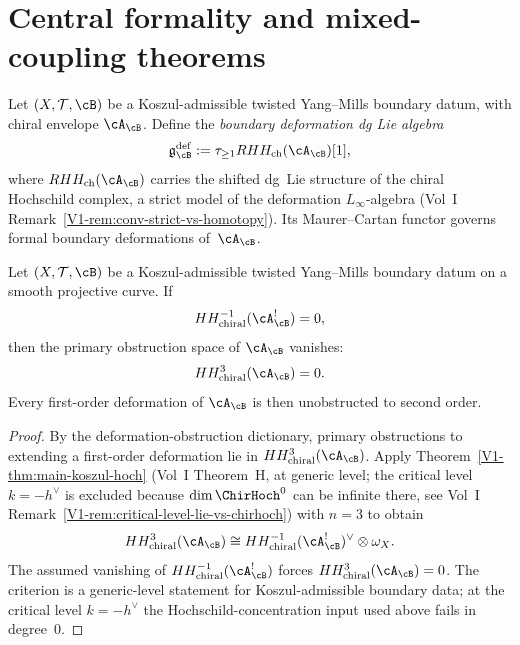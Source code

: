 \section{Central formality and mixed-coupling theorems}
\label{sec:twisted-ym-central-formality}

\begin{definition}
\label{def:twisted-ym-def-dglie}
Let $(X,\mathcal{T},\cB)$ be a Koszul-admissible twisted Yang--Mills boundary datum, with chiral envelope $\cA_{\cB}$. Define the \emph{boundary deformation dg Lie algebra}
\[
\mathfrak{g}^{\mathrm{def}}_{\cB}
:=
\tau_{\ge 1} RHH_{\mathrm{ch}}(\cA_{\cB})[1],
\]
where $RHH_{\mathrm{ch}}(\cA_{\cB})$ carries the shifted dg~Lie structure of the chiral Hochschild complex, a strict model of the deformation $L_\infty$-algebra (Vol~I Remark~\ref{V1-rem:conv-strict-vs-homotopy}). Its Maurer--Cartan functor governs formal boundary deformations of~$\cA_{\cB}$.
\end{definition}

\begin{theorem}
\label{thm:twisted-ym-dual-unobstructedness}
Let $(X,\mathcal{T},\cB)$ be a Koszul-admissible twisted Yang--Mills boundary datum on a smooth projective curve. If
\[
HH^{-1}_{\mathrm{chiral}}(\cA_{\cB}^{!}) = 0,
\]
then the primary obstruction space of $\cA_{\cB}$ vanishes:
\[
HH^{3}_{\mathrm{chiral}}(\cA_{\cB}) = 0.
\]
Every first-order deformation of $\cA_{\cB}$ is then unobstructed to second order.
\end{theorem}

\begin{proof}
By the deformation-obstruction dictionary, primary obstructions to extending a first-order deformation lie in $HH^{3}_{\mathrm{chiral}}(\cA_{\cB})$. Apply Theorem~\ref{V1-thm:main-koszul-hoch} (Vol~I Theorem~H, at generic level; the critical level $k = -h^\vee$ is excluded because $\dim \ChirHoch^0$ can be infinite there, see Vol~I Remark~\ref*{V1-rem:critical-level-lie-vs-chirhoch}) with $n=3$ to obtain
\[
HH^{3}_{\mathrm{chiral}}(\cA_{\cB})
\cong
HH^{-1}_{\mathrm{chiral}}(\cA_{\cB}^{!})^{\vee}\otimes \omega_X.
\]
The assumed vanishing of $HH^{-1}_{\mathrm{chiral}}(\cA_{\cB}^{!})$ forces $HH^{3}_{\mathrm{chiral}}(\cA_{\cB})=0$. The criterion is a generic-level statement for Koszul-admissible boundary data; at the critical level $k=-h^\vee$ the Hochschild-concentration input used above fails in degree~$0$.
\end{proof}

